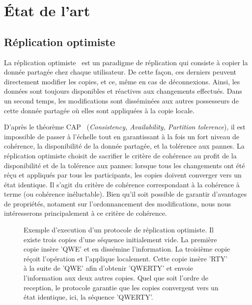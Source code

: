 
\section{État de l'art}

\subsection{Réplication optimiste}

La réplication optimiste~\cite{demers1987epidemic, saito2005optimistic} est un
paradigme de réplication qui consiste à copier la donnée partagée chez chaque
utilisateur. De cette façon, ces derniers peuvent directement modifier les
copies, et ce, même en cas de déconnexions.  Ainsi, les données sont toujours
disponibles et réactives aux changements effectués. Dans un second temps, les
modifications sont disséminées aux autres possesseurs de cette donnée partagée
où elles sont appliquées à la copie locale.

D'après le théorème CAP~\cite{gilbert2002brewer} (\emph{Consistency,
  Availability, Partition tolerence}), il est impossible de passer à l'échelle
tout en garantissant à la fois un fort niveau de cohérence, la disponibilité de
la donnée partagée, et la tolérence aux pannes. La réplication optimiste choisit
de sacrifier le critère de cohérence au profit de la disponibilité et de la
tolérence aux pannes: lorsque tous les changements ont été réçu et appliqués par
tous les participants, les copies doivent converger vers un état identique. Il
s'agit du critère de cohérence correspondant à la cohérence à terme (ou
cohérence inéluctable). Bien qu'il soit possible de garantir d'avantages de
propriétés, notament sur l'ordonnancement des modifications, nous nous
intéresserons principalement à ce critère de cohérence.

\begin{figure}
  \centering
  
  \caption{\label{fig:optimisticexample}Exemple d'execution d'un protocole de
    réplication optimiste. Il existe trois copies d'une séquence initialement
    vide. La première copie insère 'QWE' et en dissémine l'information. La
    troisième copie réçoit l'opération et l'applique localement. Cette copie
    insère 'RTY' à la suite de 'QWE' afin d'obtenir 'QWERTY' et envoie
    l'information aux deux autres copies. Quel que soit l'ordre de reception, le
    protocole garantie que les copies convergent vers un état identique, ici, la
    séquence 'QWERTY'.}
\end{figure}

